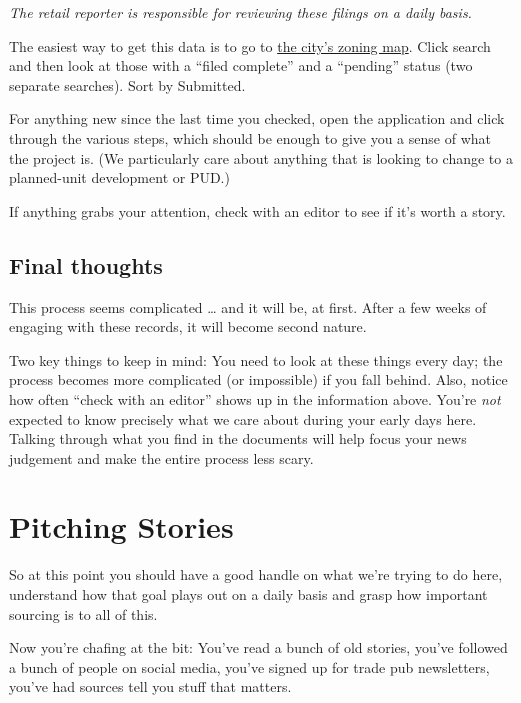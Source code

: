 \documentclass[
  11pt,
  american,
  letterpaperpaper,
  extrafontsizes,onecolumn,openright
  ]{memoir}
\begin{document}
\emph{The retail reporter is responsible for reviewing these filings on a daily basis.}

The easiest way to get this data is to go to \href{https://maps.coj.net/luzap/SearchZoningPublic.aspx}{the city's zoning map}. Click search and then look at those with a \enquote{filed complete} and a \enquote{pending} status (two separate searches). Sort by Submitted.

For anything new since the last time you checked, open the application and click through the various steps, which should be enough to give you a sense of what the project is. (We particularly care about anything that is looking to change to a planned-unit development or PUD.)

If anything grabs your attention, check with an editor to see if it's worth a story.

\hypertarget{final-thoughts-2}{%
\section*{Final thoughts}\label{final-thoughts-2}}

This process seems complicated \ldots{} and it will be, at first. After a few weeks of engaging with these records, it will become second nature.

Two key things to keep in mind: You need to look at these things every day; the process becomes more complicated (or impossible) if you fall behind. Also, notice how often \enquote{check with an editor} shows up in the information above. You're \emph{not} expected to know precisely what we care about during your early days here. Talking through what you find in the documents will help focus your news judgement and make the entire process less scary.

\hypertarget{pitching-stories}{%
\chapter{Pitching Stories}\label{pitching-stories}}

So at this point you should have a good handle on what we're trying to do here, understand how that goal plays out on a daily basis and grasp how important sourcing is to all of this.

Now you're chafing at the bit: You've read a bunch of old stories, you've followed a bunch of people on social media, you've signed up for trade pub newsletters, you've had sources tell you stuff that matters.
\end{document}
